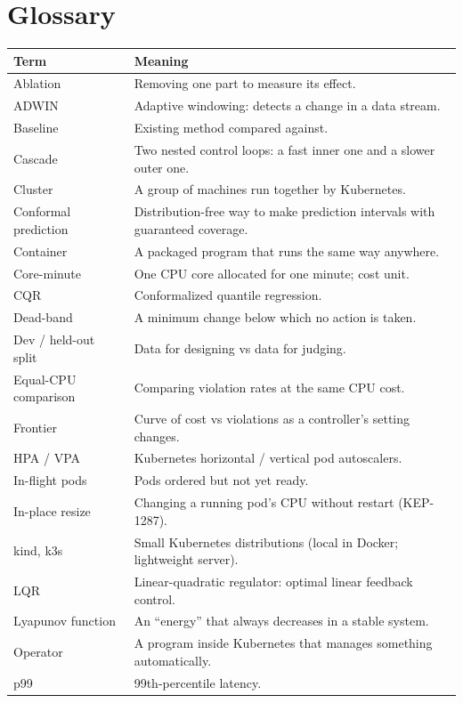 \documentclass[11pt,a4paper]{article}
\begin{document}
\section{Glossary}
\begin{longtable}{@{}p{3.6cm}p{11.4cm}@{}}
\toprule
\textbf{Term} & \textbf{Meaning} \\
\midrule
\endhead
Ablation & Removing one part to measure its effect. \\
ADWIN & Adaptive windowing: detects a change in a data stream. \\
Baseline & Existing method compared against. \\
Cascade & Two nested control loops: a fast inner one and a slower outer one. \\
Cluster & A group of machines run together by Kubernetes. \\
Conformal prediction & Distribution-free way to make prediction intervals with guaranteed coverage. \\
Container & A packaged program that runs the same way anywhere. \\
Core-minute & One CPU core allocated for one minute; cost unit. \\
CQR & Conformalized quantile regression. \\
Dead-band & A minimum change below which no action is taken. \\
Dev / held-out split & Data for designing vs data for judging. \\
Equal-CPU comparison & Comparing violation rates at the same CPU cost. \\
Frontier & Curve of cost vs violations as a controller's setting changes. \\
HPA / VPA & Kubernetes horizontal / vertical pod autoscalers. \\
In-flight pods & Pods ordered but not yet ready. \\
In-place resize & Changing a running pod's CPU without restart (KEP-1287). \\
kind, k3s & Small Kubernetes distributions (local in Docker; lightweight server). \\
LQR & Linear-quadratic regulator: optimal linear feedback control. \\
Lyapunov function & An ``energy'' that always decreases in a stable system. \\
Operator & A program inside Kubernetes that manages something automatically. \\
p99 & 99th-percentile latency. \\

\end{longtable}
\end{document}
